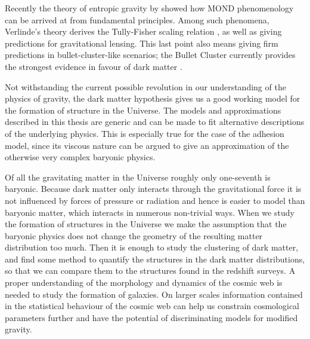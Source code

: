 Recently the theory of entropic gravity by \citet{Jacobson1995,Verlinde2011,Verlinde2016} showed how \ac{MOND} phenomenology can be arrived at from fundamental principles. Among such phenomena, Verlinde's theory derives the Tully-Fisher scaling relation \citep{Tully1977}, as well as giving predictions for gravitational lensing. This last point also means giving firm predictions in bullet-cluster-like scenarios; the Bullet Cluster currently provides the strongest evidence in favour of dark matter \citep{Clowe2004,Markevitch2004}.

Not withstanding the current possible revolution in our understanding of the physics of gravity, the dark matter hypothesis gives us a good working model for the formation of structure in the Universe. The models and approximations described in this thesis are generic and can be made to fit alternative descriptions of the underlying physics. This is especially true for the case of the adhesion model, since its viscous nature can be argued to give an approximation of the otherwise very complex baryonic physics.


Of all the gravitating matter in the Universe roughly only one-seventh is baryonic. Because dark matter only interacts through the gravitational force it is not influenced by forces of pressure or radiation and hence is easier to model than baryonic matter, which interacts in numerous non-trivial ways.
When we study the formation of structures in the Universe we make the assumption that the baryonic physics does not change the geometry of the resulting matter distribution too much. Then it is enough to study the clustering of dark matter, and find some method to quantify the structures in the dark matter distributions, so that we can compare them to the structures found in the redshift surveys.
A proper understanding of the morphology and dynamics of the cosmic web is needed to study the formation of galaxies. On larger scales information contained in the statistical behaviour of the cosmic web can help us constrain cosmological parameters further and have the potential of discriminating models for modified gravity.


